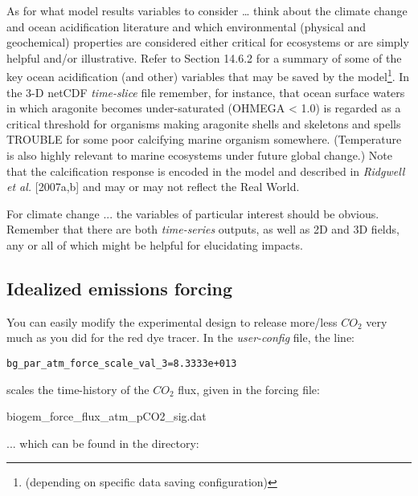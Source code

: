 \noindent As for what model results variables to consider … think about the climate change and ocean acidification literature and which environmental (physical and geochemical) properties are considered either critical for ecosystems or are simply helpful and/or illustrative. Refer to Section 14.6.2 for a summary of some of the key ocean acidification (and other) variables that may be saved by the model\footnote{(depending on specific data saving configuration)}.
In the 3-D netCDF \textit{time-slice} file remember, for instance, that ocean surface waters in which aragonite becomes under-saturated (OHMEGA < 1.0) is regarded as a critical threshold for organisms making aragonite shells and skeletons and spells TROUBLE for some poor calcifying marine organism somewhere. (Temperature is also highly relevant to marine ecosystems under future global change.) Note that the calcification response is encoded in the model and described in \textit{Ridgwell et al.} [2007a,b] and may or may not reflect the Real World.

For climate change ... the variables of particular interest should be obvious. Remember that there are both \textit{time-series} outputs, as well as  2D and 3D fields, any or all of which might be  helpful for elucidating impacts.

\newpage

\subsection{Idealized emissions forcing}

\noindent You can easily modify the experimental design to release more/less \(CO_{2}\) very much as you did for the red dye tracer. In the \textit{user-config} file, the line:
\vspace{-2pt}\small\begin{verbatim}
bg_par_atm_force_scale_val_3=8.3333e+013
\end{verbatim}\normalsize\vspace{-2pt}
scales the time-history of the  \(CO_{2}\) flux, given in the forcing file:

\vspace{2pt}
\noindent \footnotesize\textsf{biogem\_force\_flux\_atm\_pCO2\_sig.dat}\normalsize
\vspace{2pt}

\noindent ... which can be found in the directory:

